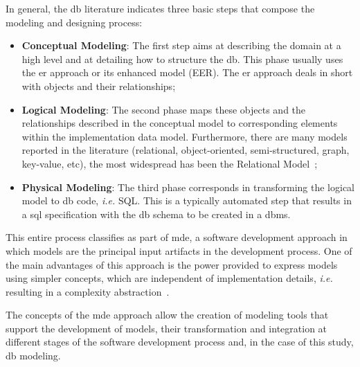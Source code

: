 In general, the \ac{db} literature indicates three basic steps that compose the modeling and designing process:
\begin{itemize}
    \item \textbf{Conceptual Modeling}: The first step aims at describing the domain at a high level and at detailing how to structure the \ac{db}.
    This phase usually uses the \ac{er} approach or its enhanced model (EER).
    The \ac{er} approach deals in short with objects and their relationships;
    
    \item \textbf{Logical Modeling}: The second phase maps these objects and the relationships described in the conceptual model to corresponding elements within the implementation data model.
    Furthermore, there are many models reported in the literature (relational, object-oriented, semi-structured, graph, key-value, etc), the most widespread has been the Relational Model~\cite{Codd:1989, Karanikolas:2011, Paredaens:2012, Robinson:2015, Puangsaijai:2017};

    \item \textbf{Physical Modeling}: The third phase corresponds in transforming the logical model to \ac{db} code, \textit{i.e.} SQL.
This is a typically automated step that results in a \ac{sql} specification with the \ac{db} schema to be created in a \ac{dbms}.
\end{itemize}


This entire process classifies as part of \ac{mde}, a software development approach in which models are the principal input artifacts in the development process.
One of the main advantages of this approach is the power provided to express models using simpler concepts, which are independent of implementation details, \textit{i.e.} resulting in a complexity abstraction~\cite{Brambilla:2017}.

The concepts of the \ac{mde} approach allow the creation of modeling tools that support the development of models, their transformation and integration at different stages of the software development process and, in the case of this study, \ac{db} modeling.

